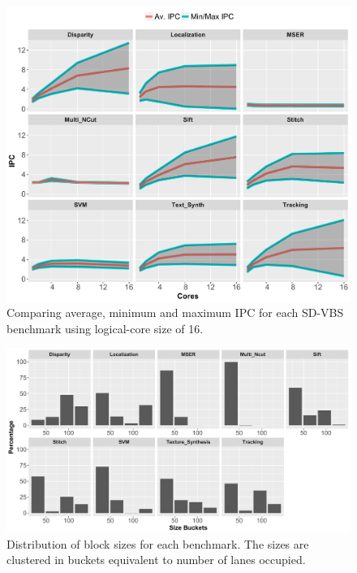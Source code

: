 \begin{figure}[t]
    \centering
    \includegraphics[width=1\textwidth]{cases-paper/graphics/Exploration/stddev3.pdf}
    \caption{Comparing average, minimum and maximum IPC for each SD-VBS benchmark using logical-core size of 16.}
    \label{fig:stddev}
		\vspace{5mm}
\end{figure}

\begin{figure}[t]
    \centering
    \includegraphics[width=1\textwidth]{cases-paper/graphics/Exploration/SizeBuckets.pdf}
    \caption{Distribution of block sizes for each benchmark. The sizes are clustered in buckets equivalent to number of lanes occupied.}
    \label{fig:block_sizes}
	\vspace{5mm}
\end{figure}

